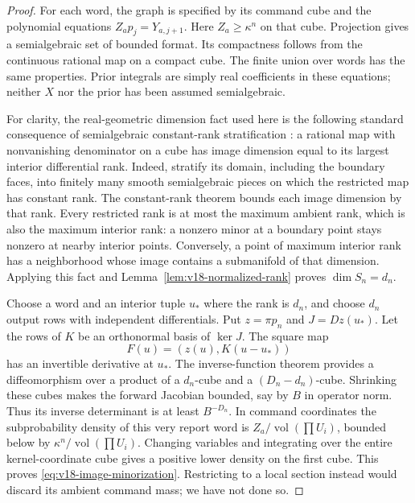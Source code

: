 \begin{proof}
For each word, the graph is specified by its command cube and the
polynomial equations $Z_ap_j=Y_{a,j+1}$. Here
$Z_a\ge\kappa^n$ on that cube. Projection gives a semialgebraic set of
bounded format. Its compactness follows from the continuous rational
map on a compact cube. The finite union over words has the same
properties. Prior integrals are simply real coefficients in these
equations; neither $X$ nor the prior has been assumed semialgebraic.

For clarity, the real-geometric dimension fact used here is the
following standard consequence of semialgebraic constant-rank
stratification \cite{BochnakCosteRoy}: a rational map with nonvanishing
denominator on a cube has image dimension equal to its largest
interior differential rank. Indeed, stratify its domain, including the
boundary faces, into finitely many smooth semialgebraic pieces on which
the restricted map has constant rank. The constant-rank theorem bounds
each image dimension by that rank. Every restricted rank is at most
the maximum ambient rank, which is also the maximum interior rank:
a nonzero minor at a boundary point stays nonzero at nearby interior
points. Conversely, a point of maximum interior rank has a neighborhood
whose image contains a submanifold of that dimension. Applying this
fact and Lemma~\ref{lem:v18-normalized-rank} proves $\dim S_n=d_n$.

Choose a word and an interior tuple $u_*$ where the rank is $d_n$, and
choose $d_n$ output rows with independent differentials. Put $z=\pi p_n$
and $J=Dz(u_*)$. Let the rows of $K$ be an orthonormal basis of
$\ker J$. The square map
\[
 F(u)=(z(u),K(u-u_*))
\]
has an invertible derivative at $u_*$. The inverse-function theorem
provides a diffeomorphism over a product of a $d_n$-cube and a
$(D_n-d_n)$-cube. Shrinking these cubes makes the forward Jacobian
bounded, say by $B$ in operator norm. Thus its inverse determinant is
at least $B^{-D_n}$. In command coordinates the subprobability density
of this very report word is $Z_a/\operatorname{vol}(\prod U_i)$,
bounded below by $\kappa^n/\operatorname{vol}(\prod U_i)$.
Changing variables and integrating over the entire kernel-coordinate
cube gives a positive lower density on the first cube. This proves
\eqref{eq:v18-image-minorization}. Restricting to a local section instead
would discard its ambient command mass; we have not done so.
\end{proof}

